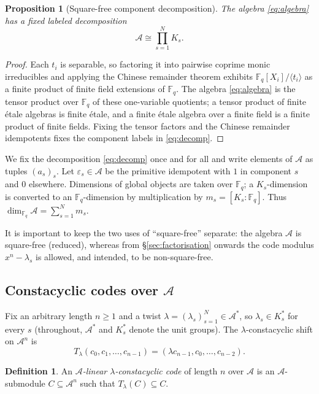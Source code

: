 \documentclass[11pt,a4paper]{article}
\newcommand{\F}{\mathbb F}
\newcommand{\A}{\mathcal A}
\numberwithin{equation}{section}
\theoremstyle{plain}
\newtheorem{proposition}[theorem]{Proposition}
\theoremstyle{definition}
\newtheorem{definition}[theorem]{Definition}
\theoremstyle{remark}
\begin{document}
\begin{proposition}[Square-free component decomposition]\label{prop:decomposition}
The algebra \eqref{eq:algebra} has a fixed labeled decomposition
\begin{equation}\label{eq:decomp}
\A\cong\prod_{s=1}^{N}K_s .
\end{equation}
\end{proposition}

\begin{proof}
Each $t_i$ is separable, so factoring it into pairwise coprime monic irreducibles
and applying the Chinese remainder theorem exhibits
$\F_q[X_i]/\langle t_i\rangle$ as a finite product of finite field extensions of
$\F_q$.  The algebra \eqref{eq:algebra} is the tensor product over $\F_q$ of
these one-variable quotients; a tensor product of finite \'{e}tale algebras is
finite \'{e}tale, and a finite \'{e}tale algebra over a finite field is a finite
product of finite fields.  Fixing the tensor factors and the Chinese remainder
idempotents fixes the component labels in \eqref{eq:decomp}.
\end{proof}

We fix the decomposition \eqref{eq:decomp} once and for all and write elements of
$\A$ as tuples $(a_s)_s$.  Let $\varepsilon_s\in\A$ be the primitive idempotent
with $1$ in component $s$ and $0$ elsewhere.  Dimensions of global objects are
taken over $\F_q$; a $K_s$-dimension is converted to an $\F_q$-dimension by
multiplication by $m_s=[K_s:\F_q]$.  Thus
$\dim_{\F_q}\A=\sum_{s=1}^{N}m_s$.

It is important to keep the two uses of ``square-free'' separate: the algebra
$\A$ is square-free (reduced), whereas from \S\ref{sec:factorisation} onwards the
code modulus $x^n-\lambda_s$ is allowed, and intended, to be non-square-free.

\subsection{Constacyclic codes over \texorpdfstring{$\A$}{A}}\label{sec:codes}

Fix an arbitrary length $n\geq1$ and a twist
$\lambda=(\lambda_s)_{s=1}^{N}\in\A^\ast$, so $\lambda_s\in K_s^\ast$ for every
$s$ (throughout, $\A^\ast$ and $K_s^\ast$ denote the unit groups).  The $\lambda$-constacyclic shift on $\A^n$ is
\[
T_\lambda(c_0,c_1,\ldots,c_{n-1})
   =(\lambda c_{n-1},c_0,\ldots,c_{n-2}).
\]

\begin{definition}\label{def:constacyclic}
An \emph{$\A$-linear $\lambda$-constacyclic code} of length $n$ over $\A$ is an
$\A$-submodule $C\subseteq\A^n$ such that $T_\lambda(C)\subseteq C$.
\end{definition}
\end{document}
